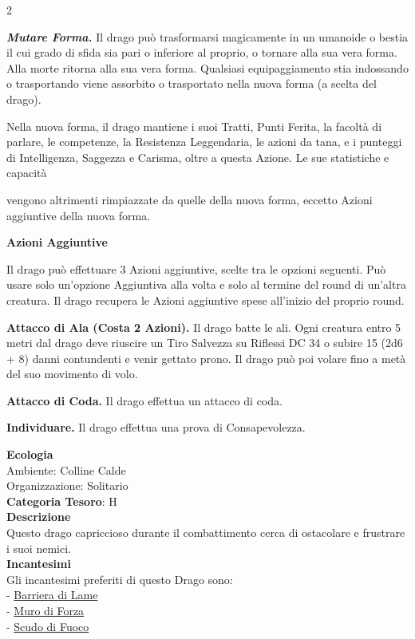 \begin{multicols}{2}
{\emph{\textbf{Mutare Forma.}} Il drago può trasformarsi magicamente in un umanoide o bestia il cui grado di sfida sia pari o inferiore al proprio, o tornare alla sua vera forma. Alla morte ritorna alla sua vera forma. Qualsiasi equipaggiamento stia indossando o trasportando viene assorbito o trasportato nella nuova forma (a scelta del drago).

Nella nuova forma, il drago mantiene i suoi Tratti, Punti Ferita, la facoltà di parlare, le competenze, la Resistenza Leggendaria, le azioni da tana, e i punteggi di Intelligenza, Saggezza e Carisma, oltre a questa Azione. Le sue statistiche e capacità

vengono altrimenti rimpiazzate da quelle della nuova forma, eccetto Azioni aggiuntive della nuova forma.

\textbf{Azioni Aggiuntive}

Il drago può effettuare 3 Azioni aggiuntive, scelte tra le opzioni seguenti. Può usare solo un'opzione Aggiuntiva alla volta e solo al termine del round di un'altra creatura. Il drago recupera le Azioni aggiuntive spese all'inizio del proprio round.

\textbf{Attacco di Ala (Costa 2 Azioni).} Il drago batte le ali. Ogni creatura entro 5 metri dal drago deve riuscire un Tiro Salvezza su Riflessi DC 34 o subire 15 (2d6 + 8) danni contundenti e venir gettato prono. Il drago può poi volare fino a metà del suo movimento di volo.

\textbf{Attacco di Coda.} Il drago effettua un attacco di coda.

\textbf{Individuare.} Il drago effettua una prova di Consapevolezza.

\textbf{Ecologia}\\
Ambiente: Colline Calde\\
Organizzazione: Solitario\\
\textbf{Categoria Tesoro}: H\\
\textbf{Descrizione}\\
Questo drago capriccioso durante il combattimento cerca di ostacolare e frustrare i suoi nemici.\\
\textbf{Incantesimi}\\
Gli incantesimi preferiti di questo Drago sono:\\
- \hyperlink{Barriera di Lame}{Barriera di Lame}\\
- \hyperlink{Muro di Forza}{Muro di Forza}\\
- \hyperlink{Scudo di Fuoco}{Scudo di Fuoco}

}
\end{multicols}
